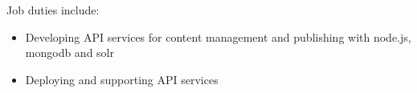 \normalsize
Job duties include:
\small
\begin{itemize}
    \item Developing API services for content management and publishing with node.js, mongodb and solr
    \item Deploying and supporting API services
\end{itemize}
\normalsize
\medskip
